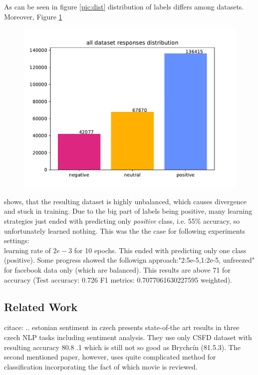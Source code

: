 As can be seen in figure \ref{pic:dist}
distribution of labels differs among datasets. Moreover, Figure \ref{pic:dist_all}
\begin{figure}[h]
\centering
\includegraphics[width=1\columnwidth]{../img/distribution_all}
\protect\caption{}
\label{pic:dist_all}
\end{figure}
shows, that the resulting dataset is highly unbalanced, which causes divergence and stuck in training. Due to the big part of labels being positive, many learning strategies just ended with predicting only \textit{positive} class, i.e. 55\% accuracy, so unfortunately learned nothing. This was the the case for following experiments settings:
\\
learning rate of $2e-3$ for 10 epochs. This ended with predicting only one class (positive). Some progress showed the followign approach:"2:5e-5,1:2e-5, unfreezed" for facebook data only (which are balanced). This results are above 71 for accuracy (Test accuracy: 0.726
F1 metrics: 0.7077061630227595 weighted).

\subsection{Related Work}
citace:
\citep{Cano2019}
\citep{Kittask2020} .. estonian
\citep{Lenc2016} sentiment in czech
\citep{Hercig2018}
\citep{Li}
\citep{Libovicky} presents state-of-the art results in three czech NLP tasks including sentiment analysis. They use only CSFD dataset with resulting accuracy 80.8 .1 which is still not so good as Brychcín (81.5.3). The second mentioned paper, however, uses quite complicated method for classification incorporating the fact of which movie is reviewed. 

